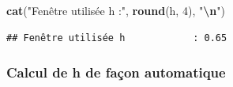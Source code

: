 \documentclass[
  12pt,
]{article}
\newenvironment{Shaded}{\begin{snugshade}}{\end{snugshade}}
\newcommand{\DecValTok}[1]{\textcolor[rgb]{0.00,0.00,0.81}{#1}}
\newcommand{\FunctionTok}[1]{\textcolor[rgb]{0.13,0.29,0.53}{\textbf{#1}}}
\newcommand{\NormalTok}[1]{#1}
\newcommand{\SpecialCharTok}[1]{\textcolor[rgb]{0.81,0.36,0.00}{\textbf{#1}}}
\newcommand{\StringTok}[1]{\textcolor[rgb]{0.31,0.60,0.02}{#1}}
\begin{document}
\begin{Shaded}
\begin{Highlighting}[]
\FunctionTok{cat}\NormalTok{(}\StringTok{"Fenêtre utilisée h            :"}\NormalTok{, }\FunctionTok{round}\NormalTok{(h, }\DecValTok{4}\NormalTok{), }\StringTok{"}\SpecialCharTok{\textbackslash{}n}\StringTok{"}\NormalTok{)}
\end{Highlighting}
\end{Shaded}

\begin{verbatim}
## Fenêtre utilisée h            : 0.65
\end{verbatim}

\subsubsection{Calcul de h de façon
automatique}\label{calcul-de-h-de-fauxe7on-automatique}
\end{document}
